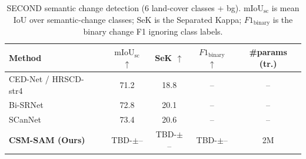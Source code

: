 \begin{table}[t]
\centering
\caption{SECOND semantic change detection (6 land-cover classes + bg).
$\mathrm{mIoU}_{\mathrm{sc}}$ is mean IoU over semantic-change classes;
SeK is the Separated Kappa; $F1_{\mathrm{binary}}$ is the binary change
F1 ignoring class labels.}
\label{tab:second}
\small
\begin{tabular}{lcccc}
\toprule
Method & $\mathrm{mIoU}_{\mathrm{sc}}$ $\uparrow$ & SeK $\uparrow$ & $F1_{\mathrm{binary}}$ $\uparrow$ & \#params (tr.) \\
\midrule
CED-Net / HRSCD-str4~\cite{daudt2018fcsiam}      & 71.2 & 18.8 & -- & -- \\ %
Bi-SRNet~\cite{ding2022bisrnet}                  & 72.8 & 20.1 & -- & -- \\ %
SCanNet~\cite{ding2024scannet}                   & 73.4 & 20.6 & -- & -- \\ %
\midrule
\textbf{CSM-SAM (Ours)}                          & TBD-$\pm$-- & TBD-$\pm$-- & TBD-$\pm$-- & 2M \\ %
\bottomrule
\end{tabular}
\end{table}
